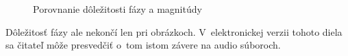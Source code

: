 \begin{figure}[htp]
    \def\path{obrazky/informatika/image_processing/mix_phase_magnitude/}
 \centering
    \caption{Porovnanie dôležitosti fázy a magnitúdy}
    \label{fig:image_phase_magnitude}
\end{figure}
Dôležitosť fázy ale nekončí len pri obrázkoch. V~elektronickej verzii
tohoto diela sa čitateľ môže presvedčiť o~tom istom závere na audio
súboroch.


